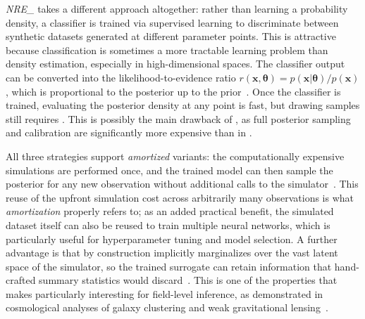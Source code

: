 \emph{\Gls{NRE_}} takes a different approach altogether: rather than learning a probability density, a classifier is trained via supervised learning to discriminate between synthetic datasets generated at different parameter points. This is attractive because classification is sometimes a more tractable learning problem than density estimation, especially in high-dimensional spaces.
The classifier output can be converted into the likelihood-to-evidence ratio $r(\mathbf{x},\boldsymbol{\theta}) = p(\mathbf{x}|\boldsymbol{\theta})/p(\mathbf{x})$, which is proportional to the posterior up to the prior~\cite{Cranmer:2020,Miller2021arxiv}.
Once the classifier is trained, evaluating the posterior density at any point is fast, but drawing samples still requires \MCMC. This is possibly the main drawback of \NRE, as full posterior sampling and calibration are significantly more expensive than in \NPE.

All three strategies support \emph{amortized} variants: the computationally expensive simulations are performed once, and the trained model can then sample the posterior for any new observation without additional calls to the simulator~\cite{Cranmer:2020}.
This reuse of the upfront simulation cost across arbitrarily many observations is what \emph{amortization} properly refers to; as an added practical benefit, the simulated dataset itself can also be reused to train multiple neural networks, which is particularly useful for hyperparameter tuning and model selection.
A further advantage is that \SBI by construction implicitly marginalizes over the vast latent space of the simulator, so the trained surrogate can retain information that hand-crafted summary statistics would discard~\cite{Cranmer:2020,Mishra-Sharma:2021oxe}. This is one of the properties that makes \SBI particularly interesting for field-level inference, as demonstrated in cosmological analyses of galaxy clustering and weak gravitational lensing~\cite{Jeffrey:2020xve,SimBIG:2023ywd,Makinen:2024bff,Zeghal:2024kic}.

